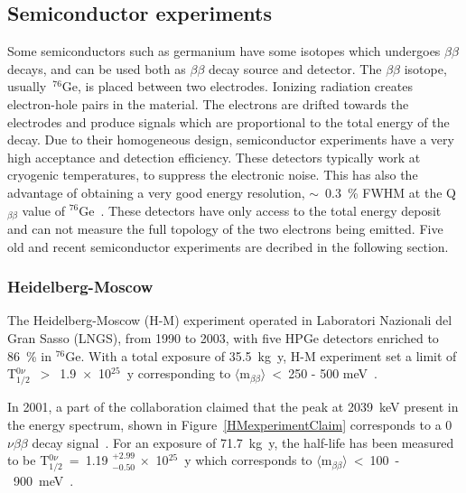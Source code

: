 \documentclass[main.tex]{subfiles}
\begin{document}
\subsection{Semiconductor experiments}


\NI Some semiconductors such as germanium have some isotopes which undergoes $\beta\beta$ decays, and can be used both as $\beta\beta$ decay source and detector. The $\beta\beta$ isotope, usually~$^{\text{76}}$Ge, is placed between two electrodes. Ionizing radiation creates electron-hole pairs in the material. The electrons are drifted towards the electrodes and produce signals which are proportional to the total energy of the decay. Due to their homogeneous design, semiconductor experiments have a very high acceptance and detection efficiency. These detectors typically work at cryogenic temperatures, to suppress the electronic noise. This has also the advantage of obtaining a very good energy resolution, $\sim$~0.3~\% FWHM at the Q$_{\beta\beta}$ value of $^{\text{76}}$Ge~\cite{QbetabetaGe}. %
These detectors have only access to the total energy deposit and can not measure the full topology of the two electrons being emitted. Five old and recent semiconductor experiments are decribed in the following section.


\subsubsection{Heidelberg-Moscow}


\NI The Heidelberg-Moscow (H-M) experiment operated in Laboratori Nazionali del Gran Sasso (LNGS), from 1990 to 2003, with five HPGe detectors enriched to 86~\% in $^{\text{76}}$Ge. With a total exposure of 35.5~kg~y, H-M experiment set a limit of T$_{\text{1/2}}^{0\nu}$~$>$~1.9~$\times$~10$^{\text{25}}$~y corresponding to $\langle \text{m}_{\beta\beta} \rangle$~<~250 - 500 meV~\cite{HeidelbergMoscow1}.


\bigskip


\NI In 2001, a part of the collaboration claimed that the peak at 2039~keV present in the energy spectrum, shown in Figure~\ref{HMexperimentClaim} corresponds to a 0$\nu\beta\beta$ decay signal~\cite{HeidelbergMoscow2}. For an exposure of 71.7~kg~y, the half-life has been measured to be T$_{\text{1/2}}^{0\nu}$~=~1.19 $^{\text{+2.99}}_{-\text{0.50}}$ $\times$~10$^{\text{25}}$~y which corresponds to $\langle \text{m}_{\beta\beta} \rangle$~<~100~-~900~meV~\cite{HeidelbergMoscow2}.
\end{document}
